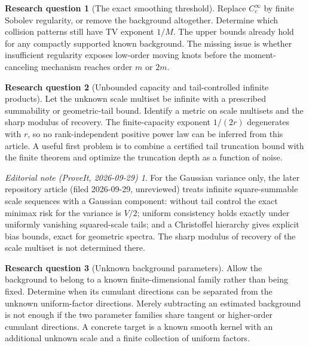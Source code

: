 \documentclass[11pt,a4paper]{article}
\numberwithin{equation}{section}
\theoremstyle{definition}
\newtheorem{problem}[problem]{Research question}
\theoremstyle{remark}
\newtheorem*{ednote}{Editorial note (ProveIt, 2026-09-29)}
\begin{document}
\begin{problem}[The exact smoothing threshold]
Replace $C_c^\infty$ by finite Sobolev regularity, or remove the background
altogether.  Determine which collision patterns still have TV exponent $1/M$.
The upper bounds already hold for any compactly supported known background.
The missing issue is whether insufficient regularity exposes low-order moving
knots before the moment-canceling mechanism reaches order $m$ or $2m$.
\end{problem}

\begin{problem}[Unbounded capacity and tail-controlled infinite products]
Let the unknown scale multiset be infinite with a prescribed summability or
geometric-tail bound.  Identify a metric on scale multisets and the sharp
modulus of recovery.  The finite-capacity exponent $1/(2r)$ degenerates with $r$,
so no rank-independent positive power law can be inferred from this article.
A useful first problem is to combine a certified tail truncation bound with the
finite theorem and optimize the truncation depth as a function of noise.
\end{problem}
\begin{ednote}
For the Gaussian variance only, the later repository article 
(filed 2026-09-29, unreviewed) treats infinite square-summable scale
sequences with a Gaussian component: without tail control the exact minimax
risk for the variance is $V/2$; uniform consistency holds exactly under
uniformly vanishing squared-scale tails; and a Christoffel hierarchy gives
explicit bias bounds, exact for geometric spectra. The sharp modulus of
recovery of the scale multiset is not determined there.
\end{ednote}

\begin{problem}[Unknown background parameters]
Allow the background to belong to a known finite-dimensional family rather
than being fixed.  Determine when its cumulant directions can be separated
from the unknown uniform-factor directions.  Merely subtracting an estimated
background is not enough if the two parameter families share tangent or
higher-order cumulant directions.  A concrete target is a known smooth kernel
with an additional unknown scale and a finite collection of uniform factors.
\end{problem}
\end{document}
